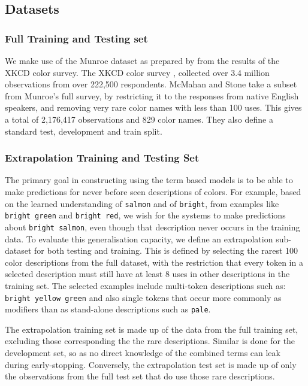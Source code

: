 \documentclass[11pt,a4paper]{article}
\newcommand{\parencite}{\citep}
\newcommand{\textcite}{\citet}
\begin{document}
\subsection{Datasets}

\subsubsection{Full Training and Testing set}
We make use of the  Munroe dataset as prepared by \textcite{mcmahan2015bayesian} from the results of the XKCD color survey.
The XKCD color survey \parencite{Munroe2010XKCDdataset}, collected over 3.4 million observations from over 222,500 respondents.
McMahan and Stone take a subset from Munroe's full survey, by restricting it to the responses from native English speakers, 
and removing very rare color names with less than 100 uses.
This gives a total of 2,176,417 observations and 829 color names. 
They also define a standard test, development and train split.


\subsubsection{Extrapolation Training and Testing Set}
The primary goal in constructing using the term based models is to be able to make predictions for never before seen descriptions of colors.
For example, based on the learned understanding of \texttt{salmon} and of \texttt{bright}, from examples like \texttt{bright green} and \texttt{bright red}, we wish for the systems to make predictions about \texttt{bright salmon}, even though that description never occurs in the training data.
%
To evaluate this generalisation capacity, we define an extrapolation sub-dataset for both testing and training.
This is defined by selecting the rarest 100 color descriptions from the full dataset,
with the restriction that every token in a selected description must still have at least 8 uses in other descriptions in the training set.
The selected examples include multi-token descriptions such as: \texttt{bright yellow green} and also single tokens that occur more commonly as modifiers than as stand-alone descriptions such as \texttt{pale}.

The extrapolation training set is made up of the data from the full training set, excluding those  corresponding the the rare descriptions.
Similar is done for the development set, so as no direct knowledge of the combined terms can leak during early-stopping.
Conversely, the extrapolation test set is made up of only the observations from the full test set that do use those rare descriptions.
\end{document}
